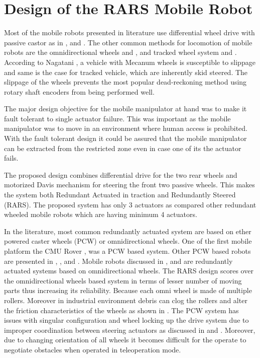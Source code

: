 \chapter{Design of the RARS Mobile Robot}
\label{ch_3:Design}


Most of the mobile robots presented in literature use differential wheel drive  with passive castor as in \cite{saha1989kinematics}, \cite{yamamoto1992coordinating} and \cite{rajendran2004}. The other  common methods for locomotion of mobile robots are the omnidirectional wheels  \cite{pin1994new} and \cite{salih2006designing}, and tracked wheel system \cite{suthakorn2009design} and \cite{guarnieri2004development}. According  to  Nagatani \cite{nagatani2000improvement},  a  vehicle  with  Mecanum  wheels  is  susceptible  to slippage and same is the case for tracked vehicle, which are inherently skid steered. The slippage of the wheels prevents the most popular dead-reckoning method using rotary shaft  encoders   from  being  performed  well.

The major design objective for the  mobile manipulator at hand  was to make it fault tolerant to single actuator failure. This was important as  the mobile manipulator was to move in an environment where human access is prohibited. With the fault tolerant design it could be assured that the mobile manipulator can be extracted from the restricted zone even in case  one of its the actuator fails. 

 The proposed design combines differential drive for the two rear wheels and  motorized Davis mechanism for steering the front two passive wheels. This makes the system both Redundant Actuated in traction and Redundantly Steered (RARS). The proposed system has only 3 actuators as compared other redundant wheeled mobile robots which are having minimum 4 actuators.  
 
 In the literature, most common redundantly  actuated system are based on ether powered caster wheels (PCW) or omnidirectional wheels. One of the first mobile platform the CMU Rover \cite{moravec1982cmu, moravec1983stanford},  was a PCW based system.  Other PCW based robots are presented in \cite{oetomo2008singularity}, \cite{chung2010design}, \cite{li2006wheel} and \cite{park2002optimal}.   Mobile robots discussed in \cite{muir1987kinematic}, \cite{yi2002kinematics} and  \cite{saha1995design} are redundantly actuated systems based on omnidirectional wheels.  The RARS design scores over the omnidirectional wheels based system in terms of lesser number  of moving parts thus increasing its reliability. Because each omni wheel is made of multiple rollers. Moreover in industrial environment debris can clog the rollers and alter the friction characteristics of the wheels as shown in \cite{carlson2005ugvs}. 
   The PCW system has issues with singular configuration and wheel locking up the drive system due to improper coordination between steering actuators as discussed in \cite{oetomo2008singularity} and \cite{low2005kinematic}. Moreover, due to changing orientation of all wheels it becomes difficult for the operate to negotiate obstacles when operated in teleoperation mode.

